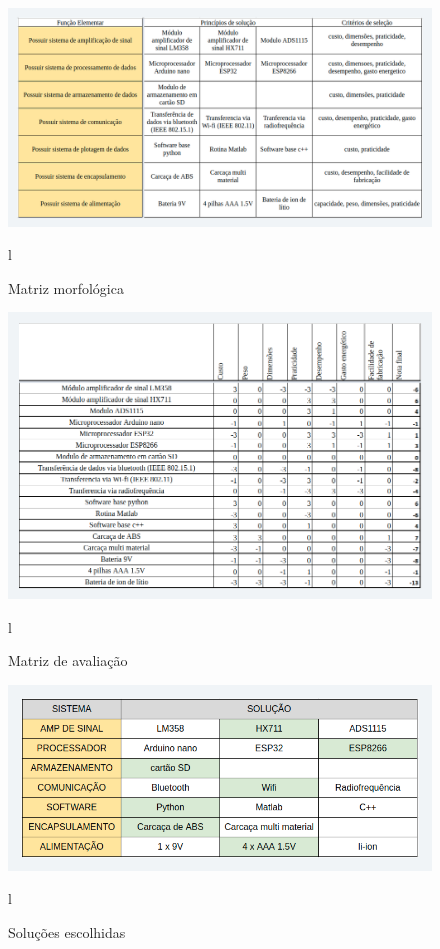 \begin{figure}[htb]
	\caption{\label{fig:2036} Matriz morfológica}
	\begin{center}
		\includegraphics[width=\textwidth]{pictures/2036.png}
	\end{center}l
\end{figure}



\begin{figure}[htb]
	\caption{\label{fig:2037} Matriz de avaliação}
	\begin{center}
		\includegraphics[width=\textwidth]{pictures/2037.png}
	\end{center}l
\end{figure}



\begin{figure}[htb]
	\caption{\label{fig:2038} Soluções escolhidas}
	\begin{center}
		\includegraphics[width=\textwidth]{pictures/2038.png}
	\end{center}l
\end{figure}

